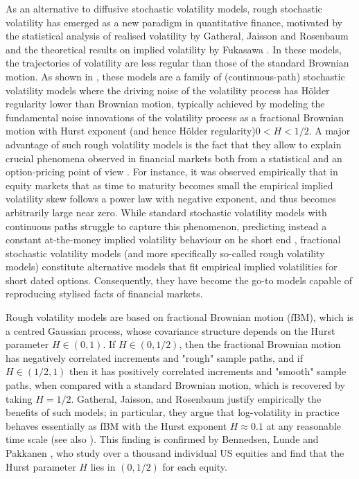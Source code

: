 \documentclass[11pt]{article}
\begin{document}
As an alternative to diffusive stochastic volatility models, rough stochastic volatility has emerged as a new paradigm in quantitative finance,  motivated by the statistical analysis of realised volatility by Gatheral, Jaisson and Rosenbaum \cite{gatheral2014volatility} and the theoretical results on implied volatility by Fukasawa \cite{fukasawa2011asymptotic}. In these models, the trajectories of volatility are less regular than those of the standard Brownian motion. As shown in \cite{gatheral2014volatility,bayer2016pricing}, these models are a family of (continuous-path) stochastic volatility models where the driving noise of the volatility process has H\"older regularity lower than Brownian motion, typically achieved by modeling the fundamental noise innovations of the volatility process as a fractional Brownian motion with Hurst exponent (and hence H\"older regularity)$0<H<1/2$.   A major advantage of such rough volatility models is the fact that they allow to  explain crucial phenomena  observed in  financial markets both from a statistical \cite{gatheral2014volatility,bennedsen2016decoupling} and
an option-pricing point of view \cite{bayer2016pricing}. For instance, it was observed empirically  that in equity markets   that as time to maturity becomes small the empirical implied volatility skew follows a power law with negative exponent, and thus becomes arbitrarily large near zero.  While standard stochastic volatility models with continuous paths struggle to capture this phenomenon, predicting instead a constant at-the-money implied volatility behaviour on he short end  \cite{gatheral2011volatility}, 
 fractional stochastic volatility models (and more specifically so-called rough volatility models) constitute  alternative  models  that  fit empirical implied volatilities for short dated options. Consequently, they have become the go-to models capable of reproducing stylised facts of financial markets.



 Rough volatility models are based on fractional Brownian motion (fBM), which  is a centred Gaussian process, whose covariance structure depends on the Hurst parameter $H \in (0, 1)$. If $H \in(0,1/2)$, then the fractional Brownian motion has negatively correlated increments and "rough" sample paths, and if $H \in (1/2,1)$ then it has positively correlated increments and "smooth" sample paths, when compared with a standard Brownian motion, which is recovered by taking $H=1/2$. Gatheral, Jaisson, and Rosenbaum \cite{gatheral2014volatility} justify  empirically  the benefits of such models; in particular, they argue that log-volatility in practice behaves essentially as fBM with the Hurst exponent $H \approx 0.1$ at any reasonable time scale (see also  \cite{gatheral2014volatility_2}). This finding is confirmed  by Bennedsen, Lunde and Pakkanen \cite{bennedsen2016decoupling}, who study over a thousand individual US equities and find that the Hurst parameter $H$ lies in $(0,1/2)$ for each equity.
\end{document}
